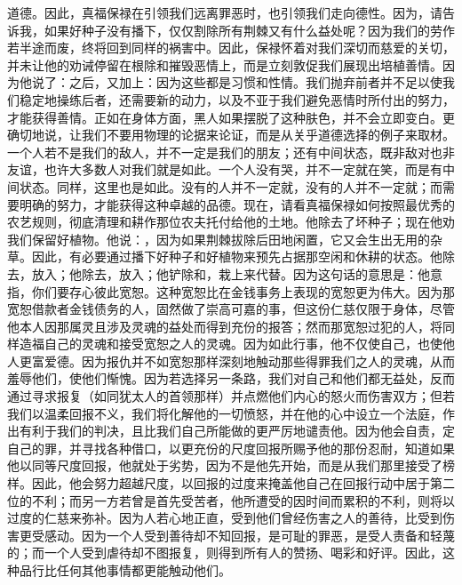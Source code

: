 道德。因此，真福保禄在引领我们远离罪恶时，也引领我们走向德性。因为，请告诉我，如果好种子没有播下，仅仅割除所有荆棘又有什么益处呢？因为我们的劳作若半途而废，终将回到同样的祸害中。因此，保禄怀着对我们深切而慈爱的关切，并未让他的劝诫停留在根除和摧毁恶情上，而是立刻敦促我们展现出培植善情。因为他说了：之后，又加上：因为这些都是习惯和性情。我们抛弃前者并不足以使我们稳定地操练后者，还需要新的动力，以及不亚于我们避免恶情时所付出的努力，才能获得善情。正如在身体方面，黑人如果摆脱了这种肤色，并不会立即变白。更确切地说，让我们不要用物理的论据来论证，而是从关乎道德选择的例子来取材。一个人若不是我们的敌人，并不一定是我们的朋友；还有中间状态，既非敌对也非友谊，也许大多数人对我们就是如此。一个人没有哭，并不一定就在笑，而是有中间状态。同样，这里也是如此。没有的人并不一定就，没有的人并不一定就；而需要明确的努力，才能获得这种卓越的品德。现在，请看真福保禄如何按照最优秀的农艺规则，彻底清理和耕作那位农夫托付给他的土地。他除去了坏种子；现在他劝我们保留好植物。他说：，因为如果荆棘拔除后田地闲置，它又会生出无用的杂草。因此，有必要通过播下好种子和好植物来预先占据那空闲和休耕的状态。他除去，放入；他除去，放入；他铲除和，栽上来代替。因为这句话的意思是：他意指，你们要存心彼此宽恕。这种宽恕比在金钱事务上表现的宽恕更为伟大。因为那宽恕借款者金钱债务的人，固然做了崇高可嘉的事，但这份仁慈仅限于身体，尽管他本人因那属灵且涉及灵魂的益处而得到充份的报答；然而那宽恕过犯的人，将同样造福自己的灵魂和接受宽恕之人的灵魂。因为如此行事，他不仅使自己，也使他人更富爱德。因为报仇并不如宽恕那样深刻地触动那些得罪我们之人的灵魂，从而羞辱他们，使他们惭愧。因为若选择另一条路，我们对自己和他们都无益处，反而通过寻求报复（如同犹太人的首领那样）并点燃他们内心的怒火而伤害双方；但若我们以温柔回报不义，我们将化解他的一切愤怒，并在他的心中设立一个法庭，作出有利于我们的判决，且比我们自己所能做的更严厉地谴责他。因为他会自责，定自己的罪，并寻找各种借口，以更充份的尺度回报所赐予他的那份忍耐，知道如果他以同等尺度回报，他就处于劣势，因为不是他先开始，而是从我们那里接受了榜样。因此，他会努力超越尺度，以回报的过度来掩盖他自己在回报行动中居于第二位的不利；而另一方若曾是首先受苦者，他所遭受的因时间而累积的不利，则将以过度的仁慈来弥补。因为人若心地正直，受到他们曾经伤害之人的善待，比受到伤害更受感动。因为一个人受到善待却不知回报，是可耻的罪恶，是受人责备和轻蔑的；而一个人受到虐待却不图报复，则得到所有人的赞扬、喝彩和好评。因此，这种品行比任何其他事情都更能触动他们。\par

